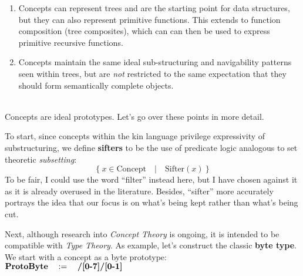\documentclass[twoside]{article}
\begin{document}
\begin{minipage}{10.5cm}
\begin{enumerate}
\item Concepts can represent trees and are the starting point for data structures, but they can also represent primitive functions.
      This extends to function composition (tree composites), which can can then be used to express primitive recursive functions.
\item Concepts maintain the same ideal sub-structuring and navigability patterns seen within trees, but are
      \emph{not} restricted to the same expectation that they should form semantically complete objects.
\end{enumerate}

\end{minipage}\\[0.5cm]

Concepts are ideal prototypes. Let's go over these points in more detail.

To start, since concepts within the kin language privilege expressivity of substructuring,
we define {\bf sifters} to be the use of predicate logic analogous to set theoretic \emph{subsetting}:
$$ \{\ x\in \mbox{Concept}\quad | \quad \mbox{Sifter}(x)\ \} $$
To be fair, I could use the word ``filter'' instead here, but I have chosen against it as it is already overused in the literature.
Besides, ``sifter'' more accurately portrays the idea that our focus is on what's being kept rather than what's being cut.

Next, although research into \emph{Concept Theory} is ongoing, it is intended to be compatible with \emph{Type Theory}.
As example, let's construct the classic {\bf byte type}. We start with a concept as a byte prototype:\\[0.1cm]

\noindent $ \mbox{\bf ProtoByte}\quad :=\quad \mbox{\bf /[0-7]/[0-1]} $\\[0.1cm]
\end{document}
